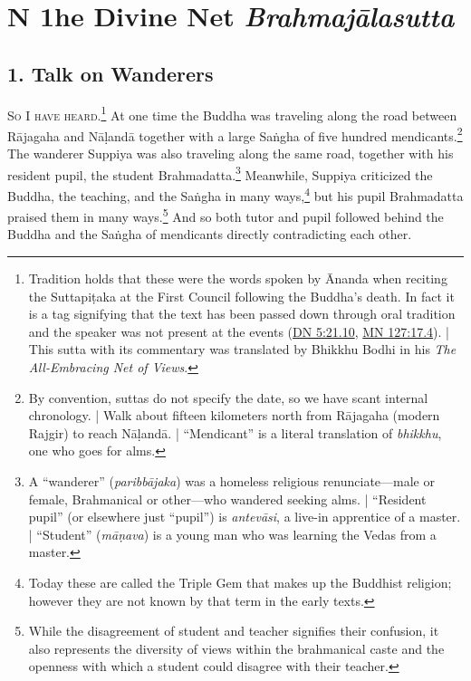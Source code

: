 \documentclass[12pt,openany]{book}%
\newcommand*{\suttatitleacronym}[1]{\smaller[2]{#1}\vspace*{.3em}}
\newcommand*{\suttatitletranslation}[1]{\linebreak{#1}}
\newcommand*{\suttatitleroot}[1]{\linebreak\smaller[2]\itshape{#1}}
\newcommand*{\tocacronym}[1]{\hspace*{-3.3em}{#1}\quad}
\newcommand*{\toctranslation}[1]{#1}
\newcommand*{\tocroot}[1]{(\textit{#1})}
\newcommand*{\scevam}[1]{\textsc{#1}}
\renewcommand*{\tocacronym}[1]{\hspace*{0em}{#1}\quad}%
\begin{document}
\chapter*{{\suttatitleacronym DN 1}{\suttatitletranslation The Divine Net }{\suttatitleroot Brahmajālasutta}}
\addcontentsline{toc}{chapter}{\tocacronym{DN 1} \toctranslation{The Divine Net } \tocroot{Brahmajālasutta}}

\section*{1. Talk on Wanderers }

\scevam{So I have heard.\footnote{Tradition holds that these were the words spoken by Ānanda when reciting the \textsanskrit{Suttapiṭaka} at the First Council following the Buddha’s death. In fact it is a tag signifying that the text has been passed down through oral tradition and the speaker was not present at the events (\href{https://suttacentral.net/dn5/en/sujato\#21.10}{DN 5:21.10}, \href{https://suttacentral.net/mn127/en/sujato\#17.4}{MN 127:17.4}). | This sutta with its commentary was translated by Bhikkhu Bodhi in his \emph{The All-Embracing Net of Views}. } }At one time the Buddha was traveling along the road between \textsanskrit{Rājagaha} and \textsanskrit{Nāḷandā} together with a large \textsanskrit{Saṅgha} of five hundred mendicants.\footnote{By convention, suttas do not specify the date, so we have scant internal chronology. | Walk about fifteen kilometers north from \textsanskrit{Rājagaha} (modern Rajgir) to reach \textsanskrit{Nāḷandā}. | “Mendicant” is a literal translation of \textit{bhikkhu}, one who goes for alms. } The wanderer Suppiya was also traveling along the same road, together with his resident pupil, the student Brahmadatta.\footnote{A “wanderer” (\textit{\textsanskrit{paribbājaka}}) was a homeless religious renunciate—male or female, Brahmanical or other—who wandered seeking alms. | “Resident pupil” (or elsewhere just “pupil”) is \textit{\textsanskrit{antevāsi}}, a live-in apprentice of a master. | “Student” (\textit{\textsanskrit{māṇava}}) is a young man who was learning the Vedas from a master. } Meanwhile, Suppiya criticized the Buddha, the teaching, and the \textsanskrit{Saṅgha} in many ways,\footnote{Today these are called the Triple Gem that makes up the Buddhist religion; however they are not known by that term in the early texts. } but his pupil Brahmadatta praised them in many ways.\footnote{While the disagreement of student and teacher signifies their confusion, it also represents the diversity of views within the brahmanical caste and the openness with which a student could disagree with their teacher. } And so both tutor and pupil followed behind the Buddha and the \textsanskrit{Saṅgha} of mendicants directly contradicting each other. 
\end{document}
